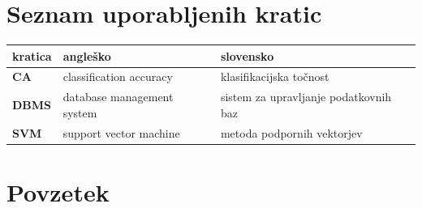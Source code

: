 \documentclass[a4paper, 12pt]{book}
\newcommand{\clearemptydoublepage}{\newpage{\pagestyle{empty}\cleardoublepage}}
\begin{document}
\pagestyle{empty}
\def\thepage{}%
\tableofcontents{}


\clearemptydoublepage


\chapter*{Seznam uporabljenih kratic}  %

\noindent\begin{tabular}{p{}|p{}|p{}}    %
  {\bf kratica} & {\bf angleško}                             & {\bf slovensko} \\ \hline
  {\bf CA}      & classification accuracy               & klasifikacijska točnost \\
  {\bf DBMS} & database management system & sistem za upravljanje podatkovnih baz \\
  {\bf SVM}   & support vector machine              & metoda podpornih vektorjev \\
\end{tabular}


\clearemptydoublepage

\chapter*{Povzetek}
\end{document}
